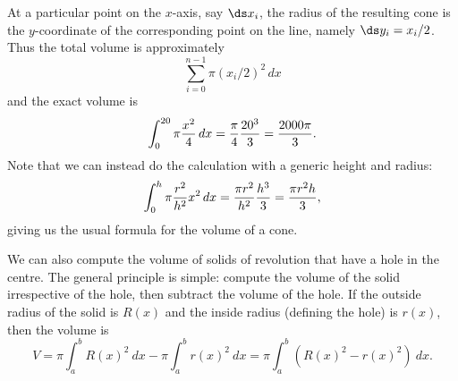 \begin{solution}

At a particular point on the $x$-axis, say $\ds x_i$, the radius of the
resulting cone is the $y$-coordinate of the corresponding point on the
line, namely $\ds y_i=x_i/2$. Thus the total volume is approximately
$$\sum_{i=0}^{n-1} \pi (x_i/2)^2\,dx$$
and the exact volume is
$$
  \int_0^{20} \pi
  {x^2\over4}\,dx={\pi\over4}{20^3\over3}={2000\pi\over3}.
$$ 
Note that we can instead do the calculation with a generic height and
radius: 
$$
  \int_0^{h} \pi{r^2\over h^2}x^2\,dx
  ={\pi r^2\over h^2}{h^3\over3}={\pi r^2h\over3},
$$ 
giving us the usual formula for the volume of a cone.
\end{solution}


%
We can also compute the volume of solids of revolution that have a hole in the centre. The general principle is simple: compute the volume of the solid irrespective of the hole, then subtract the volume of the hole. If the outside radius of the solid is $R(x)$ and the inside radius (defining the hole) is $r(x)$, then the volume is 
$$V = \pi\int_a^b R(x)^2 \ dx - \pi\int_a^b r(x)^2\ dx = \pi\int_a^b \left(R(x)^2-r(x)^2\right)\ dx.$$




